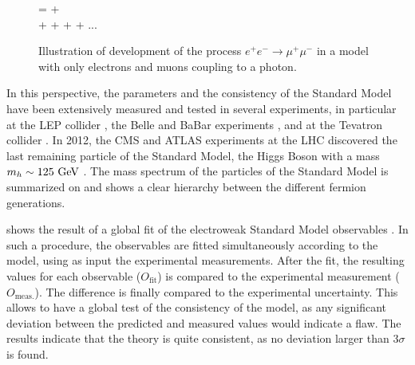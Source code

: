     \begin{figure}
        \centering
        {
            =
            +
            \nonumber
            \\
            +
            +
            +
            +
            ...
            \nonumber
        }
        \caption{Illustration of development of the process $e^+ e^- \rightarrow \mu^+ \mu^-$
        in a model with only electrons and muons coupling to a photon. \label{fig:perturbativeDevelopment}}
    \end{figure}

    In this perspective, the parameters and the consistency of the Standard
    Model have been extensively measured and tested in several experiments, in particular
    at the LEP collider , the Belle and BaBar experiments , and at the Tevatron collider . In 2012,
    the CMS and ATLAS experiments at the LHC discovered the last remaining particle of the
    Standard Model, the Higgs Boson with a mass $m_{h} \sim 125~\text{GeV}$ \cite{CMSHiggs,ATLASHiggs}. The mass
    spectrum of the particles of the Standard Model is summarized on  and
    shows a clear hierarchy between the different fermion generations.

     shows the result of a global fit of the electroweak
    Standard Model observables \cite{GFitter}. In such a procedure, the observables are
    fitted simultaneously according to the model, using as input the experimental measurements.
    After the fit, the resulting values for each observable ($O_\text{fit}$) is compared to
    the experimental measurement ($O_\text{meas.}$). The difference is finally compared to
    the experimental uncertainty. This allows to have a global test of the consistency of
    the model, as any significant deviation between the predicted and measured values would
    indicate a flaw. The results indicate that the theory is quite consistent, as no deviation
    larger than 3$\sigma$ is found.

